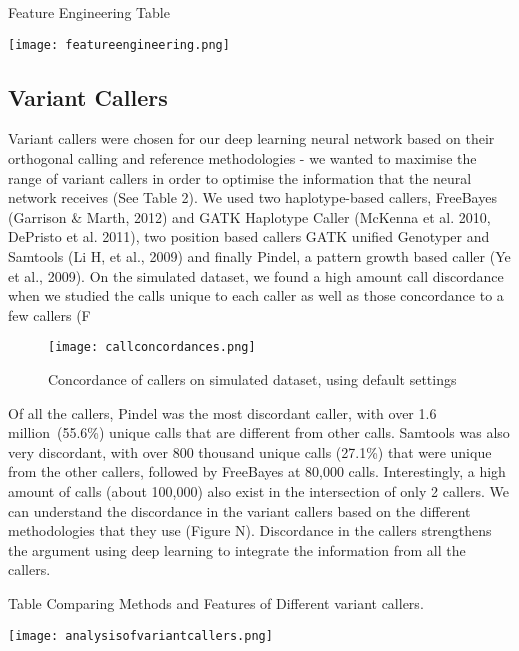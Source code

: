 \documentclass{article}
\begin{document}
\begin{table}[H]
\caption{Feature Engineering Table}
\texttt{[image: featureengineering.png]}
\centering
\end{table}
\subsection{Variant Callers}
Variant callers were chosen for our deep learning neural network based on their orthogonal calling and reference methodologies - we wanted to maximise the range of variant callers in order to optimise the information that the neural network receives (See Table 2). We used two haplotype-based callers, FreeBayes (Garrison \& Marth, 2012) and GATK Haplotype Caller (McKenna et al. 2010, DePristo et al. 2011), two position based callers GATK unified Genotyper and Samtools (Li H, et al., 2009) and finally Pindel, a pattern growth based caller (Ye et al., 2009). On the simulated dataset, we found a high amount call discordance when we studied the calls unique to each caller as well as those concordance to a few callers (F
\begin{figure}[H]
\texttt{[image: callconcordances.png]}
\centering
\caption{Concordance of callers on simulated dataset, using default settings}
\end{figure} 
Of all the callers, Pindel was the most discordant caller, with over 1.6 million\ (55.6\%) unique calls that are different from other calls. Samtools was also very discordant, with over 800 thousand unique calls (27.1\%) that were unique from the other callers, followed by FreeBayes at 80,000 calls. Interestingly, a high amount of calls (about 100,000) also exist in the intersection of only 2 callers. We can understand the discordance in the variant callers based on the different methodologies that they use (Figure N). Discordance in the callers strengthens the argument using deep learning to integrate the information from all the callers.

\begin{table}[H]
\caption{Table Comparing Methods and Features of Different variant callers.}
\texttt{[image: analysisofvariantcallers.png]}
\centering
\end{table}
\end{document}
